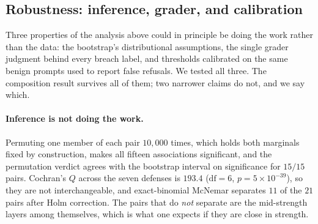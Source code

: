 %
%

\subsection{Robustness: inference, grader, and calibration}
\label{sec:robustness}

Three properties of the analysis above could in principle be doing the work rather than the
data: the bootstrap's distributional assumptions, the single grader judgment behind every
breach label, and thresholds calibrated on the same benign prompts used to report false
refusals. We tested all three. The composition result survives all of them; two narrower
claims do not, and we say which.

\paragraph{Inference is not doing the work.}
Permuting one member of each pair $10{,}000$ times, which holds both marginals fixed by
construction, makes all fifteen associations significant, and the permutation verdict agrees
with the bootstrap interval on significance for $15/15$ pairs. Cochran's $Q$ across the seven
defenses is $193.4$ ($\mathrm{df}=6$, $p=5\times10^{-39}$), so they are not interchangeable,
and exact-binomial McNemar separates $11$ of the $21$ pairs after Holm correction. The pairs
that do \emph{not} separate are the mid-strength layers among themselves, which is what one
expects if they are close in strength.

